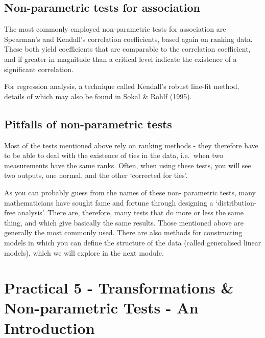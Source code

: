 \documentclass[
]{book}
\begin{document}
\hypertarget{non-parametric-tests-for-association}{%
\subsection*{Non-parametric tests for association}\label{non-parametric-tests-for-association}}

The most commonly employed non-parametric tests for association are Spearman's and Kendall's correlation coefficients, based again on ranking data. These both yield coefficients that are comparable to the correlation coefficient, and if greater in magnitude than a critical level indicate the existence of a significant correlation.

For regression analysis, a technique called Kendall's robust line-fit method, details of which may also be found in Sokal \& Rohlf (1995).

\hypertarget{pitfalls-of-non-parametric-tests}{%
\subsection*{Pitfalls of non-parametric tests}\label{pitfalls-of-non-parametric-tests}}

Most of the tests mentioned above rely on ranking methods - they therefore have to be able to deal with the existence of ties in the data, i.e.~when two measurements have the same ranks. Often, when using these tests, you will see two outputs, one normal, and the other `corrected for ties'.

As you can probably guess from the names of these non- parametric tests, many mathematicians have sought fame and fortune through designing a `distribution-free analysis'. There are, therefore, many tests that do more or less the same thing, and which give basically the same results. Those mentioned above are generally the most commonly used. There are also methods for constructing models in which you can define the structure of the data (called generalised linear models), which we will explore in the next module.

\hypertarget{practical-5---transformations-non-parametric-tests---an-introduction}{%
\section{Practical 5 - Transformations \& Non-parametric Tests - An Introduction}\label{practical-5---transformations-non-parametric-tests---an-introduction}}
\end{document}

